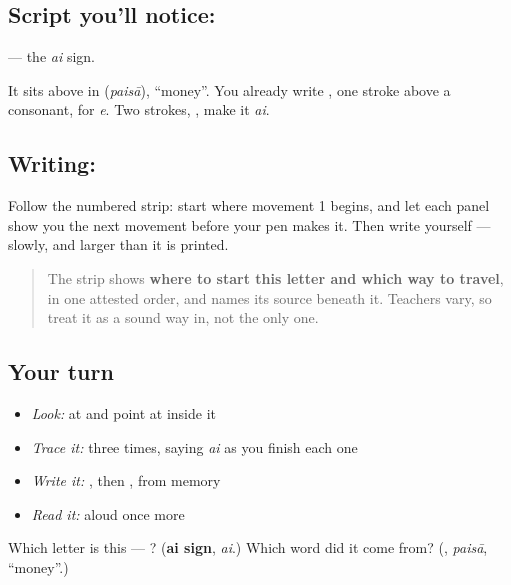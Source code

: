 \subsection*{Script you'll notice: }
\textbf{} — the \emph{ai} sign.

It sits above \textbf{} in \textbf{} (\emph{paisā}), \textquotedblleft{}money\textquotedblright{}. You already write \textbf{}, one stroke above a consonant, for \emph{e}. Two strokes, \textbf{}, make it \emph{ai}.

\subsection*{Writing: }

Follow the numbered strip: start where movement 1 begins, and let each panel show you the next movement before your pen makes it. Then write  yourself — slowly, and larger than it is printed.

\begin{quote}
The strip shows \textbf{where to start this letter and which way to travel}, in one attested order, and names its source beneath it. Teachers vary, so treat it as a sound way in, not the only one.
\end{quote}

\subsection*{Your turn}
\begin{itemize}
\raggedright
  \item \emph{Look:} at \textbf{} and point at  inside it
  \item \emph{Trace it:}  three times, saying \emph{ai} as you finish each one
  \item \emph{Write it:} , then , from memory
  \item \emph{Read it:} \textbf{} aloud once more
\end{itemize}

\begin{tcolorbox}[breakable,colback=teal!4,colframe=teal!35!black,title={Before you move on}]
Which letter is this — ? (\textbf{ai sign}, \emph{ai}.) Which word did it come from? (\textbf{}, \emph{paisā}, \textquotedblleft{}money\textquotedblright{}.)
\end{tcolorbox}
